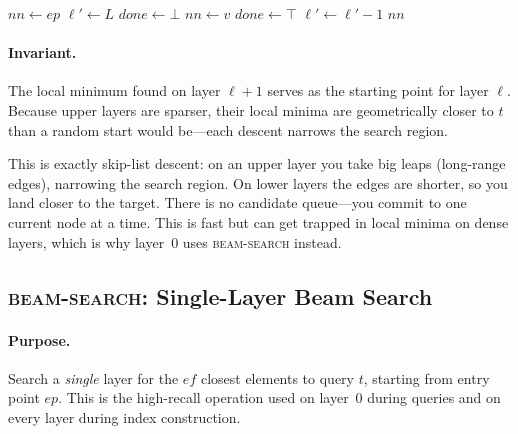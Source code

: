 \documentclass[11pt]{article}
\newcommand{\eps}{\mathit{ep}}
\newcommand{\ef}{\mathit{ef}}
\newcommand{\nn}{\mathit{nn}}
\theoremstyle{definition}
\begin{document}
\begin{algorithm}
\caption{\textsc{find-nn} --- greedy descent across all layers}
\begin{algorithmic}[1]
  \State $\nn \gets \eps$
  \State $\ell' \gets L$
    \Repeat
      \State $\mathit{done} \gets \bot$
      \For{$v \in N(\nn, \ell')$}
        \If{$d(v, t) < d(\nn, t)$}
          \State $\nn \gets v$
          \State $\mathit{done} \gets \top$
        \EndIf
      \EndFor
    \State $\ell' \gets \ell' - 1$
  \EndWhile
  \State \Return $\nn$
\EndFunction
\end{algorithmic}
\end{algorithm}

\paragraph{Invariant.} The local minimum found on layer $\ell+1$ serves as the starting point for layer $\ell$. Because upper layers are sparser, their local minima are geometrically closer to $t$ than a random start would be---each descent narrows the search region.

\begin{intubox}
This is exactly skip-list descent: on an upper layer you take big leaps (long-range edges), narrowing the search region. On lower layers the edges are shorter, so you land closer to the target. There is no candidate queue---you commit to one current node at a time. This is fast but can get trapped in local minima on dense layers, which is why layer~0 uses \textsc{beam-search} instead.
\end{intubox}

\subsection{\textsc{beam-search}: Single-Layer Beam Search}
\label{sec:beam-search}

\paragraph{Purpose.} Search a \emph{single} layer for the $\ef$ closest elements to query $t$, starting from entry point $\eps$. This is the high-recall operation used on layer~0 during queries and on every layer during index construction.
\end{document}
